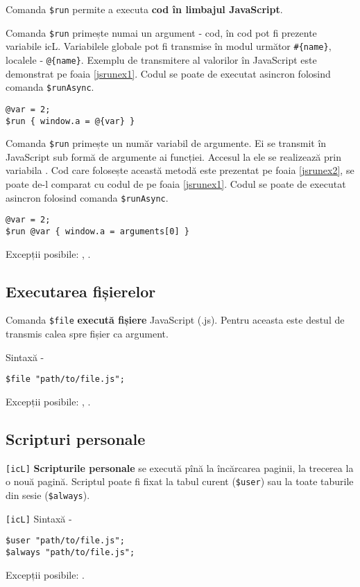 Comanda \lstinline|$run| permite a executa {\bf cod în limbajul JavaScript}.

\code{[icL]} Comanda \lstinline|$run| primește numai un argument - cod, în cod pot fi prezente variabile icL. Variabilele globale pot fi transmise în modul următor \lstinline|#{name}|, localele - \lstinline|@{name}|. Exemplu de transmitere al valorilor în JavaScript este demonstrat pe foaia \ref{jsrunex1}. Codul se poate de executat asincron folosind comanda \lstinline|$runAsync|.

\begin{lstlisting}[caption=Executarea codului în limbajul JavaScript (icL), label=jsrunex1]
@var = 2;
$run { window.a = @{var} }
\end{lstlisting}

\code{[w3c]} Comanda \lstinline|$run| primește un număr variabil de argumente. Ei se transmit în JavaScript sub formă de argumente ai funcției. Accesul la ele se realizează prin variabila . Cod care folosește această metodă este prezentat pe foaia \ref{jsrunex2}, se poate de-l comparat cu codul de pe foaia \ref{jsrunex1}. Codul se poate de executat asincron folosind comanda \lstinline|$runAsync|.

\begin{lstlisting}[caption=Executarea codului în limbajul JavaScript (w3c), label=jsrunex2]
@var = 2;
$run @var { window.a = arguments[0] }
\end{lstlisting}

Excepții posibile: , .

\subsection{Executarea fișierelor}

Comanda \lstinline|$file| {\bf execută fișiere} JavaScript (.js). Pentru aceasta este destul de transmis calea spre fișier ca argument.

Sintaxă -
\begin{lstlisting}[numbers=none]
$file "path/to/file.js";
\end{lstlisting}

Excepții posibile: , .

\subsection{Scripturi personale}

\lstinline|[icL]| {\bf Scripturile personale} se execută pînă la încărcarea paginii, la trecerea la o nouă pagină. Scriptul poate fi fixat la tabul curent (\lstinline|$user|) sau la toate taburile din sesie (\lstinline|$always|).

\lstinline|[icL]| Sintaxă -
\begin{lstlisting}[numbers=none]
$user "path/to/file.js";
$always "path/to/file.js";
\end{lstlisting}

Excepții posibile: .

